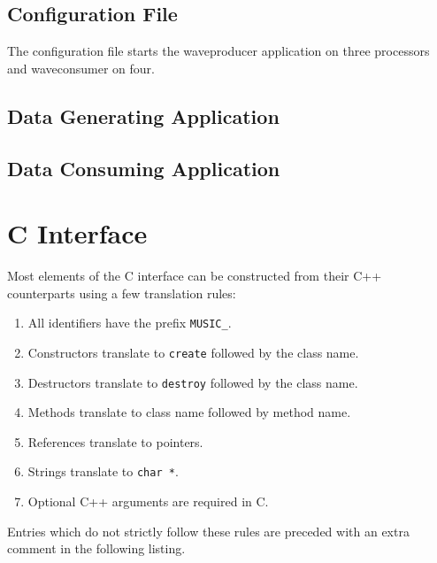 \documentclass[a4paper,twoside]{report}
\begin{document}
\section{Configuration File}
\label{sec:conffile}

The configuration file starts the waveproducer application on three
processors and waveconsumer on four.




\section{Data Generating Application}




\section{Data Consuming Application}




\chapter{C Interface}
\label{app:cint}

Most elements of the C interface can be constructed from their C++
counterparts using a few translation rules:

\begin{enumerate}
\item All identifiers have the prefix \lstinline|MUSIC_|.
\item Constructors translate to \lstinline|create| followed by the
  class name.
\item Destructors translate to \lstinline|destroy| followed by the
  class name.
\item Methods translate to class name followed by method name.
\item References translate to pointers.
\item Strings translate to \lstinline|char *|.
\item Optional C++ arguments are required in C.
\end{enumerate}

Entries which do not strictly follow these rules are preceded with an
extra comment in the following listing.


\end{document}
